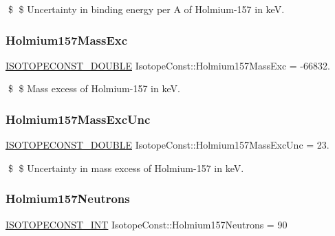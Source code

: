 \$ \$ Uncertainty in binding energy per A of Holmium-\/157 in keV. \mbox{\label{group___isotope_const-_holmium-_ho157_gacd310cf41d1b70feaead765f28912fca}} 
\subsubsection{\texorpdfstring{Holmium157\+Mass\+Exc}{Holmium157MassExc}}
{\footnotesize\ttfamily \mbox{\hyperlink{group___isotope_const-_macros_ga8f45a7272ce02c0b4c65c44636ed719a}{I\+S\+O\+T\+O\+P\+E\+C\+O\+N\+S\+T\+\_\+\+D\+O\+U\+B\+LE}} Isotope\+Const\+::\+Holmium157\+Mass\+Exc = -\/66832.}

\$ \$ Mass excess of Holmium-\/157 in keV. \mbox{\label{group___isotope_const-_holmium-_ho157_ga99273eca7809066c46dffd86ed267844}} 
\subsubsection{\texorpdfstring{Holmium157\+Mass\+Exc\+Unc}{Holmium157MassExcUnc}}
{\footnotesize\ttfamily \mbox{\hyperlink{group___isotope_const-_macros_ga8f45a7272ce02c0b4c65c44636ed719a}{I\+S\+O\+T\+O\+P\+E\+C\+O\+N\+S\+T\+\_\+\+D\+O\+U\+B\+LE}} Isotope\+Const\+::\+Holmium157\+Mass\+Exc\+Unc = 23.}

\$ \$ Uncertainty in mass excess of Holmium-\/157 in keV. \mbox{\label{group___isotope_const-_holmium-_ho157_gafd40e0562cf648c93ae311b2a4fc59ca}} 
\subsubsection{\texorpdfstring{Holmium157\+Neutrons}{Holmium157Neutrons}}
{\footnotesize\ttfamily \mbox{\hyperlink{group___isotope_const-_macros_ga5f18360b3e99483a35c32d789e62621c}{I\+S\+O\+T\+O\+P\+E\+C\+O\+N\+S\+T\+\_\+\+I\+NT}} Isotope\+Const\+::\+Holmium157\+Neutrons = 90}

